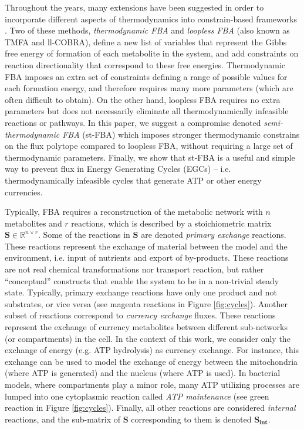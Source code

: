 \documentclass[twocolumn]{bmcart}%
\newcommand{\Sint}{\mathbf{S_{int}}}
\begin{document}
Throughout the years, many extensions have been suggested in order to incorporate different aspects of thermodynamics into constrain-based frameworks \cite{Beard2002-xt, Warren2007-wm, Henry2007-xp, Schellenberger2011-bq, Price2006-ua, Bordel2010-pl, Fleming2010-py, Holzhutter2004-qj, Fleming2009-um, Kummel2006-qn, Henry2006-nt, Hoppe2007-sw, De_Martino2012-cj, Tepper2013-gd, Nolan2006-eg, Nagrath2007-bn, Boghigian2010-vz}.
Two of these methods, \textit{thermodynamic FBA} \cite{Henry2007-xp} and \textit{loopless FBA} \cite{Schellenberger2011-bq} (also known as TMFA and ll-COBRA), define a new list of variables that represent the Gibbs free energy of formation of each metabolite in the system, and add constraints on reaction directionality that correspond to these free energies. Thermodynamic FBA imposes an extra set of constraints defining a range of possible values for each formation energy, and therefore requires many more parameters (which are often difficult to obtain). On the other hand, loopless FBA requires no extra parameters but does not necessarily eliminate all thermodynamically infeasible reactions or pathways. In this paper, we suggest a compromise denoted \textit{semi-thermodynamic FBA} (st-FBA) which imposes stronger thermodynamic constrains on the flux polytope compared to loopless FBA, without requiring a large set of thermodynamic parameters. Finally, we show that st-FBA is a useful and simple way to prevent flux in Energy Generating Cycles (EGCs) -- i.e. thermodynamically infeasible cycles that generate ATP or other energy currencies.

Typically, FBA requires a reconstruction of the metabolic network with $n$ metabolites and $r$ reactions, which is described by a stoichiometric matrix $\mathbf{S} \in \mathbb{R}^{n \times r}$. Some of the reactions in $\mathbf{S}$ are denoted \emph{primary exchange} reactions. These reactions represent the exchange of material between the model and the environment, i.e. input of nutrients and export of by-products. These reactions are not real chemical transformations nor transport reaction, but rather ``conceptual'' constructs that enable the system to be in a non-trivial steady state. Typically, primary exchange reactions have only one product and not substrates, or vice versa (see magenta reactions in Figure \ref{fig:cycles}). Another subset of reactions correspond to \emph{currency exchange} fluxes. These reactions represent the exchange of currency metabolites between different sub-networks (or compartments) in the cell. In the context of this work, we consider only the exchange of energy (e.g. ATP hydrolysis) as currency exchange. For instance, this exchange can be used to model the exchange of energy between the mitochondria (where ATP is generated) and the nucleus (where ATP is used). In bacterial models, where compartments play a minor role, many ATP utilizing processes are lumped into one cytoplasmic reaction called \emph{ATP maintenance} (see green reaction in Figure \ref{fig:cycles}). Finally, all other reactions are considered \emph{internal} reactions, and the sub-matrix of $\mathbf{S}$ corresponding to them is denoted $\Sint$.
\end{document}
